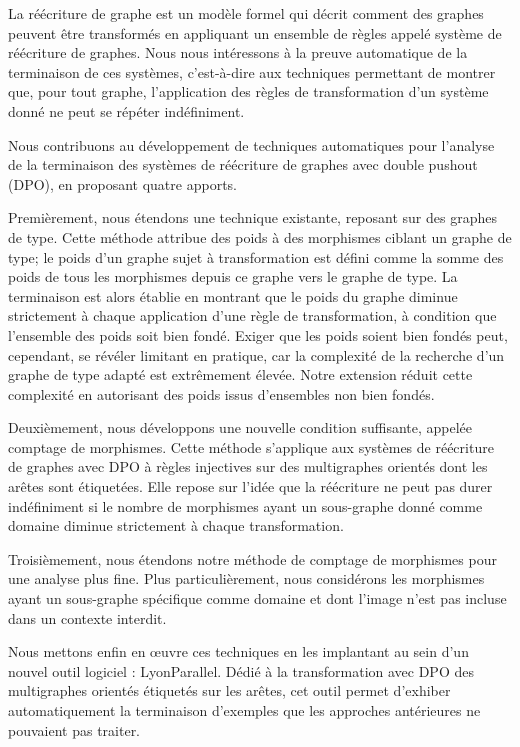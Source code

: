 La réécriture de graphe est un modèle formel qui décrit comment des graphes peuvent être transformés en appliquant un ensemble de règles appelé système de réécriture de graphes. Nous nous intéressons à la preuve automatique de la terminaison de ces systèmes, c'est-à-dire aux techniques permettant de montrer que, pour tout graphe, l'application des règles de transformation d'un système donné ne peut se répéter indéfiniment.

Nous contribuons au développement de techniques automatiques pour l'analyse de la terminaison des systèmes de réécriture de graphes avec double pushout (DPO), en proposant quatre apports.

Premièrement, nous étendons une technique existante,
reposant sur des graphes de type. Cette méthode attribue des poids à des morphismes ciblant un graphe de type; le poids d'un graphe sujet à transformation est défini comme la somme des poids de tous les morphismes depuis ce graphe vers le graphe de type. La terminaison est alors établie en montrant que le poids du graphe diminue strictement à chaque application d'une règle de transformation, à condition que l'ensemble des poids soit bien fondé. Exiger que les poids soient bien fondés peut, cependant, se révéler limitant en pratique, car la complexité de la recherche d'un graphe de type adapté est extrêmement élevée. Notre extension réduit cette complexité en autorisant des poids issus d'ensembles non bien fondés. 

Deuxièmement, nous développons une nouvelle condition suffisante, appelée comptage de morphismes. Cette méthode s'applique aux systèmes de réécriture de graphes avec DPO à règles injectives sur des multigraphes orientés dont les arêtes sont étiquetées. Elle repose sur l'idée que la réécriture ne peut pas durer indéfiniment si le nombre de morphismes ayant un sous-graphe donné comme domaine diminue strictement à chaque transformation.

Troisièmement, nous étendons notre méthode de comptage de morphismes pour une analyse plus fine. Plus particulièrement, nous considérons les morphismes ayant un sous-graphe spécifique comme domaine et dont l'image n'est pas incluse dans un contexte interdit.

Nous mettons enfin en œuvre ces techniques en les implantant au sein d'un nouvel outil logiciel : LyonParallel. Dédié à la transformation avec DPO des multigraphes orientés étiquetés sur les arêtes, cet outil permet d'exhiber automatiquement la terminaison d'exemples que les approches antérieures ne pouvaient pas traiter.
